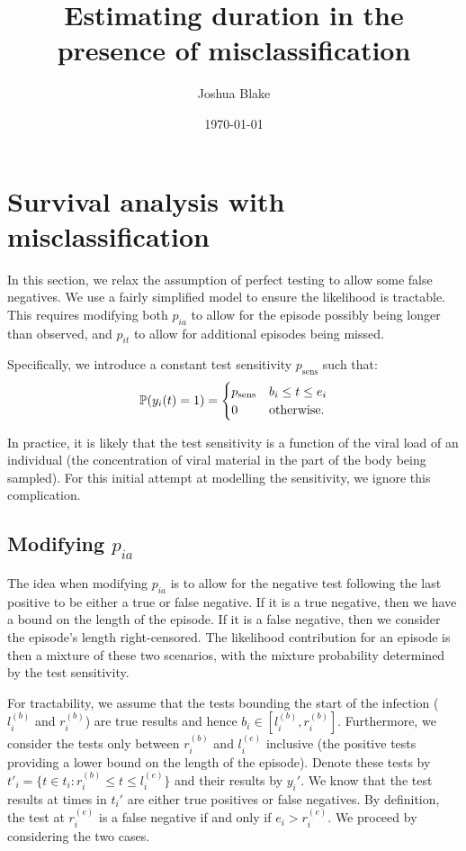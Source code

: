 \documentclass[thesis.tex]{subfiles}
\title{Estimating duration in the presence of misclassification}
\author{Joshua Blake}
\date{\today}
\begin{document}
\chapter{Survival analysis with misclassification} \label{imperf-test}

In this section, we relax the assumption of perfect testing to allow
some false negatives. We use a fairly simplified model to ensure the
likelihood is tractable. This requires modifying both $p_{ia}$ to
allow for the episode possibly being longer than observed, and
$p_{it}$ to allow for additional episodes being missed.

Specifically, we introduce a constant test sensitivity $p_\text{sens}$
such that:
\begin{align}
\operatorname{\mathbb{P}}(y_i(t) = 1) = \begin{cases} p_\text{sens} &b_i \leq t \leq e_i \\ 0 &\text{otherwise.}\end{cases}
\end{align}

In practice, it is likely that the test sensitivity is a function of the
viral load of an individual (the concentration of viral material in the
part of the body being sampled). For this initial attempt at modelling
the sensitivity, we ignore this complication.

\section{Modifying $p_{ia}$} \label{modifying-p_ia}

The idea when modifying $p_{ia}$ is to allow for the negative test
following the last positive to be either a true or false negative. If it
is a true negative, then we have a bound on the length of the episode.
If it is a false negative, then we consider the episode's length
right-censored. The likelihood contribution for an episode is then a
mixture of these two scenarios, with the mixture probability determined
by the test sensitivity.

For tractability, we assume that the tests bounding the start of the
infection ($l_i^{(b)}$ and $r_i^{(b)}$) are true results and hence
$b_i \in [l_i^{(b)}, r_i^{(b)}]$. Furthermore, we consider the tests
only between $r_i^{(b)}$ and $l_i^{(e)}$ inclusive (the positive
tests providing a lower bound on the length of the episode). Denote
these tests by
$t'_i = \{ t \in t_i : r_i^{(b)} \leq t \leq l_i^{(e)} \}$ and their
results by $y_i'$. We know that the test results at times in $t_i'$
are either true positives or false negatives. By definition, the test at
$r_i^{(e)}$ is a false negative if and only if $e_i > r_i^{(e)}$. We
proceed by considering the two cases.
\end{document}

